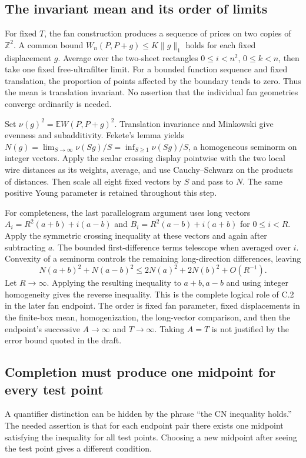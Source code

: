 \documentclass[11pt,letterpaper]{article}
\theoremstyle{definition}\newtheorem{definition}[theorem]{Definition}\newtheorem{example}[theorem]{Example}
\theoremstyle{remark}\newtheorem{remark}[theorem]{Remark}
\begin{document}
\subsection{The invariant mean and its order of limits}
For fixed $T$, the fan construction produces a sequence of prices on two copies of $\mathbb Z^2$. A common bound $W_n(P,P+g)\le K\|g\|_1$ holds for each fixed displacement $g$. Average over the two-sheet rectangles $0\le i<n^2$, $0\le k<n$, then take one fixed free-ultrafilter limit. For a bounded function sequence and fixed translation, the proportion of points affected by the boundary tends to zero. Thus the mean is translation invariant. No assertion that the individual fan geometries converge ordinarily is needed.

Set $\nu(g)^2=\mathbb E W(P,P+g)^2$. Translation invariance and Minkowski give evenness and subadditivity. Fekete's lemma yields $N(g)=\lim_{S\to\infty}\nu(Sg)/S=\inf_{S\ge1}\nu(Sg)/S$, a homogeneous seminorm on integer vectors. Apply the scalar crossing display pointwise with the two local wire distances as its weights, average, and use Cauchy--Schwarz on the products of distances. Then scale all eight fixed vectors by $S$ and pass to $N$. The same positive Young parameter is retained throughout this step.

For completeness, the last parallelogram argument uses long vectors $A_i=R^2(a+b)+i(a-b)$ and $B_i=R^2(a-b)+i(a+b)$ for $0\le i<R$. Apply the symmetric crossing inequality at these vectors and again after subtracting $a$. The bounded first-difference terms telescope when averaged over $i$. Convexity of a seminorm controls the remaining long-direction differences, leaving
\[
 N(a+b)^2+N(a-b)^2\le 2N(a)^2+2N(b)^2+O(R^{-1}).
\]
Let $R\to\infty$. Applying the resulting inequality to $a+b,a-b$ and using integer homogeneity gives the reverse inequality. This is the complete logical role of C.2 in the later fan endpoint. The order is fixed fan parameter, fixed displacements in the finite-box mean, homogenization, the long-vector comparison, and then the endpoint's successive $A\to\infty$ and $T\to\infty$. Taking $A=T$ is not justified by the error bound quoted in the draft.

\subsection{Completion must produce one midpoint for every test point}\label{sec:completiondetail}
A quantifier distinction can be hidden by the phrase ``the CN inequality holds.'' The needed assertion is that for each endpoint pair there exists one midpoint satisfying the inequality for all test points. Choosing a new midpoint after seeing the test point gives a different condition.
\end{document}
